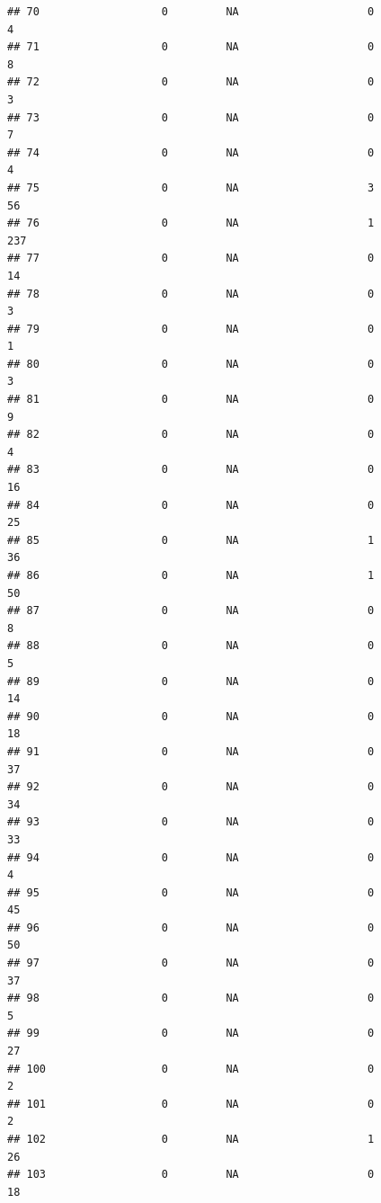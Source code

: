 \documentclass[
]{article}
\begin{document}
\begin{verbatim}
## 70                   0         NA                    0                  4
## 71                   0         NA                    0                  8
## 72                   0         NA                    0                  3
## 73                   0         NA                    0                  7
## 74                   0         NA                    0                  4
## 75                   0         NA                    3                 56
## 76                   0         NA                    1                237
## 77                   0         NA                    0                 14
## 78                   0         NA                    0                  3
## 79                   0         NA                    0                  1
## 80                   0         NA                    0                  3
## 81                   0         NA                    0                  9
## 82                   0         NA                    0                  4
## 83                   0         NA                    0                 16
## 84                   0         NA                    0                 25
## 85                   0         NA                    1                 36
## 86                   0         NA                    1                 50
## 87                   0         NA                    0                  8
## 88                   0         NA                    0                  5
## 89                   0         NA                    0                 14
## 90                   0         NA                    0                 18
## 91                   0         NA                    0                 37
## 92                   0         NA                    0                 34
## 93                   0         NA                    0                 33
## 94                   0         NA                    0                  4
## 95                   0         NA                    0                 45
## 96                   0         NA                    0                 50
## 97                   0         NA                    0                 37
## 98                   0         NA                    0                  5
## 99                   0         NA                    0                 27
## 100                  0         NA                    0                  2
## 101                  0         NA                    0                  2
## 102                  0         NA                    1                 26
## 103                  0         NA                    0                 18

\end{verbatim}
\end{document}
